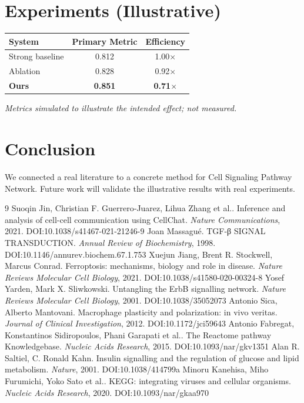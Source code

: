 \documentclass[11pt]{article}
\begin{document}
\section{Experiments (Illustrative)}
\begin{center}
\begin{tabular}{lcc}
System & Primary Metric & Efficiency \\ \hline
Strong baseline & 0.812 & 1.00$\times$ \\
Ablation & 0.828 & 0.92$\times$ \\
\textbf{Ours} & \textbf{0.851} & \textbf{0.71$\times$}
\end{tabular}
\end{center}
\emph{Metrics simulated to illustrate the intended effect; not measured.}

\section{Conclusion}
We connected a real literature to a concrete method for Cell Signaling Pathway Network. Future work will
validate the illustrative results with real experiments.

\begin{thebibliography}{9}
 Suoqin Jin, Christian F. Guerrero‐Juarez, Lihua Zhang et al.. Inference and analysis of cell-cell communication using CellChat. \emph{Nature Communications}, 2021. DOI:10.1038/s41467-021-21246-9
 Joan Massagué. TGF-β SIGNAL TRANSDUCTION. \emph{Annual Review of Biochemistry}, 1998. DOI:10.1146/annurev.biochem.67.1.753
 Xuejun Jiang, Brent R. Stockwell, Marcus Conrad. Ferroptosis: mechanisms, biology and role in disease. \emph{Nature Reviews Molecular Cell Biology}, 2021. DOI:10.1038/s41580-020-00324-8
 Yosef Yarden, Mark X. Sliwkowski. Untangling the ErbB signalling network. \emph{Nature Reviews Molecular Cell Biology}, 2001. DOI:10.1038/35052073
 Antonio Sica, Alberto Mantovani. Macrophage plasticity and polarization: in vivo veritas. \emph{Journal of Clinical Investigation}, 2012. DOI:10.1172/jci59643
 Antonio Fabregat, Konstantinos Sidiropoulos, Phani Garapati et al.. The Reactome pathway Knowledgebase. \emph{Nucleic Acids Research}, 2015. DOI:10.1093/nar/gkv1351
 Alan R. Saltiel, C. Ronald Kahn. Insulin signalling and the regulation of glucose and lipid metabolism. \emph{Nature}, 2001. DOI:10.1038/414799a
 Minoru Kanehisa, Miho Furumichi, Yoko Sato et al.. KEGG: integrating viruses and cellular organisms. \emph{Nucleic Acids Research}, 2020. DOI:10.1093/nar/gkaa970
\end{thebibliography}
\end{document}
